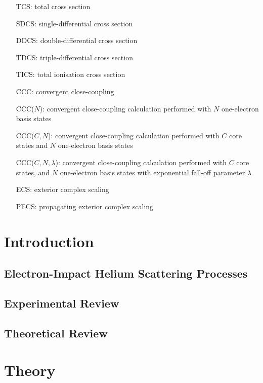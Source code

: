 \documentclass[draft]{article}
\def\mainmatter{%
    \pagenumbering{arabic}
    \setcounter{page}{1}
    \setcounter{section}{0}
    \renewcommand{\thesection}{\arabic{section}}
}%
\begin{document}
\begin{itemize}
\item[TCS:] total cross section
\item[SDCS:] single-differential cross section
\item[DDCS:] double-differential cross section
\item[TDCS:] triple-differential cross section
\item[TICS:] total ionisation cross section
\item[CCC:] convergent close-coupling
\item[CCC($N$):] convergent close-coupling calculation performed with $N$
  one-electron basis states
\item[CCC($C, N$):] convergent close-coupling calculation performed with $C$ core
  states and $N$ one-electron basis states
\item[CCC($C, N, \lambda$):] convergent close-coupling calculation performed with
  $C$ core states, and $N$ one-electron basis states with exponential fall-off
  parameter $\lambda$
\item[ECS:] exterior complex scaling
\item[PECS:] propagating exterior complex scaling
\end{itemize}

\clearpage

\mainmatter

\section{Introduction}
\label{sec:in}

\subsection{Electron-Impact Helium Scattering Processes}
\label{sec:in-proc}

\subsection{Experimental Review}
\label{sec:in-exp}

\subsection{Theoretical Review}
\label{sec:in-th}

\section{Theory}
\label{sec:th}
\end{document}
